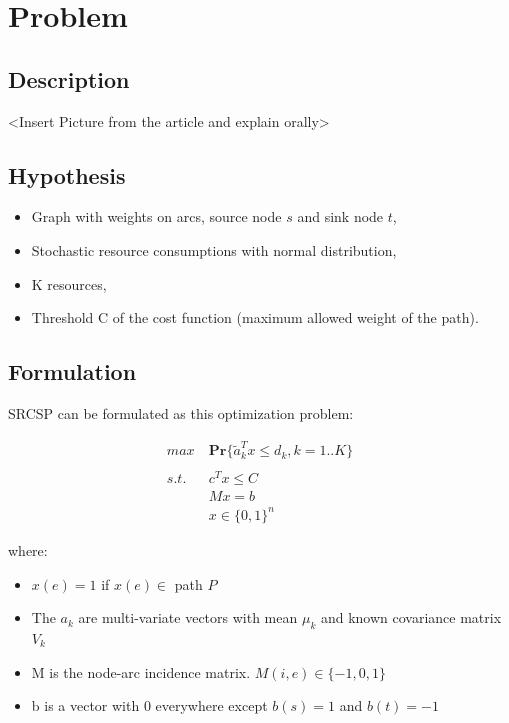 \documentclass{beamer}
\begin{document}
\section{Problem}
\subsection{Description}

\begin{frame}
	<Insert Picture from the article and explain orally>
\end{frame}

\subsection{Hypothesis}
\begin{frame}
	\begin{itemize}
		\item Graph with weights on arcs, source node $s$ and sink node $t$,
		\item Stochastic resource consumptions with normal distribution,
		\item K resources,
		\item Threshold C of the cost function (maximum allowed weight of the path).
	\end{itemize}
\end{frame}

\subsection{Formulation}
\begin{frame}

SRCSP can be formulated as this optimization problem:

\begin{align*}
 max\ &\mathbf{Pr} \{ \tilde{a}_k^Tx \leq d_k, k=1..K \} \\ \\
 s.t.\ &c^T x \leq C \\
 &Mx = b \\
 &x \in \{0, 1\}^n
\end{align*}

where:

\begin{itemize}
	\item $x(e) = 1$ if $x(e) \in $ path $P$
	\item The $a_k$ are multi-variate vectors with mean $\mu_k$ and known covariance matrix $V_k$
	\item M is the node-arc incidence matrix. $M(i, e) \in \{-1, 0, 1\}$
	\item b is a vector with 0 everywhere except $b(s) = 1$ and $b(t) = -1$
\end{itemize}

\end{frame}
\end{document}
